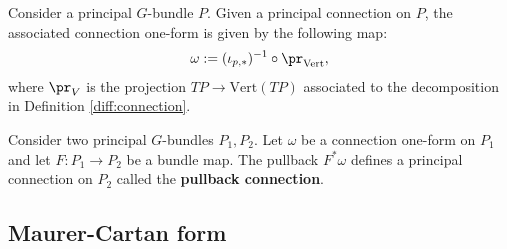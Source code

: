     \begin{property}
        Consider a principal $G$-bundle $P$. Given a principal connection on $P$, the associated connection one-form is given by the following map:
        \begin{gather}
            \omega := (\iota_{p,\ast})^{-1}\circ\pr_{\text{Vert}},
        \end{gather}
        where $\pr_V$ is the projection $TP\rightarrow\text{Vert}(TP)$ associated to the decomposition in Definition \ref{diff:connection}.
    \end{property}

    \begin{property}
        Consider two principal $G$-bundles $P_1,P_2$. Let $\omega$ be a connection one-form on $P_1$ and let $F:P_1\rightarrow P_2$ be a bundle map. The pullback $F^*\omega$ defines a principal connection on $P_2$ called the \textbf{pullback connection}.
    \end{property}

\subsection{Maurer-Cartan form}

